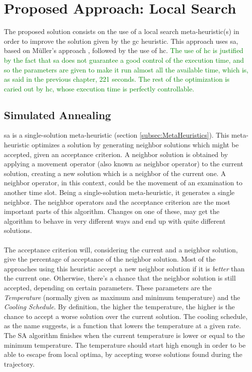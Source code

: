 \chapter{Proposed Approach: Local Search}
\label{chap:LocalSearch}
\thispagestyle{plain}

The proposed solution consists on the use of a local search meta-heuristic(s) in order to improve the solution given by the \gls{gc} heuristic. This approach uses \gls{sa}, based on M\"{u}ller's approach \cite{Mueller2009}, followed by the use of \gls{hc}. \textcolor{green}{The use of \gls{hc} is justified by the fact that \gls{sa} does not guarantee a good control of the execution time, and so the parameters are given to make it run almost all the available time, which is, as said in the previous chapter, 221 seconds. The rest of the optimization is caried out by \gls{hc}, whose execution time is perfectly controllable.}

\section{Simulated Annealing}
\label{sec:SimulatedAnnealing}

\gls{sa} is a single-solution meta-heuristic (section \ref{subsec:MetaHeuristics}). This meta-heuristic optimizes a solution by generating neighbor solutions which might be accepted, given an acceptance criterion. A neighbor solution is obtained by applying a movement operator (also known as neighbor operator) to the current solution, creating a new solution which is a neighbor of the current one. A neighbor operator, in this context, could be the movement of an examination to another time slot. Being a single-solution meta-heuristic, it generates a single neighbor. The neighbor operators and the acceptance criterion are the most important parts of this algorithm. Changes on one of these, may get the algorithm to behave in very different ways and end up with quite different solutions.\\
\\
The acceptance criterion will, considering the current and a neighbor solution, give the percentage of acceptance of the neighbor solution. Most of the approaches using this heuristic accept a new neighbor solution if it is \textit{better} than the current one. Otherwise, there's a chance that the neighbor solution is still accepted, depending on certain parameters. These parameters are the \textit{Temperature} (normally given as maximum and minimum temperature) and the \textit{Cooling Schedule}. By definition, the higher the temperature, the higher is the chance to accept a worse solution over the current solution. The cooling schedule, as the name suggests, is a function that lowers the temperature at a given rate. The SA algorithm finishes when the current temperature is lower or equal to the minimum temperature. The temperature should start high enough in order to be able to escape from local optima, by accepting worse solutions found during the trajectory.

